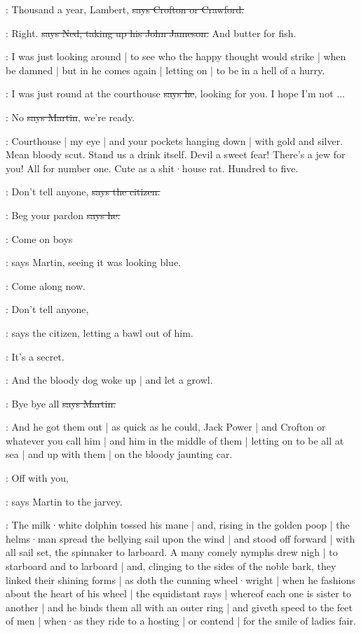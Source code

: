 \crofton:
Thousand a year,
Lambert,
\sout{says Crofton or Crawford.}

\lambert:
Right.
\sout{says Ned,
taking up his John Jameson.}
And butter for fish.

\Nq:
I was just looking around |
to see who the happy thought would strike |
when be damned |
but in he comes again |
letting on |
to be in a hell of a hurry.


\Bloom:
I was just round at the courthouse
\sout{says he},
looking for you.
I hope I'm not ...

\cunningham:
No
\sout{says Martin},
we're ready.

\Nq:
Courthouse |
my eye |
and your pockets hanging down |
with gold and silver.
Mean bloody scut.
Stand us a drink itself.
Devil a sweet fear!
There's a jew for you!
All for number one.
Cute as a shit·house rat.
Hundred to five.

\citizen:
Don't tell anyone,
\sout{says the citizen.}

\Bloom:
Beg your pardon
\sout{says he.}

\cunningham:
Come on boys

\Nq:
says Martin,
seeing it was looking blue.

\cunningham:
Come along now.

\citizen:
Don't tell anyone,

\Nq:
says the citizen,
letting a bawl out of him.

\citizen:
It's a secret.

\Nq:
And the bloody dog woke up |
and let a growl.

\cunningham:
Bye bye all
\sout{says Martin.}

\Nq:
And he got them out |
as quick as he could,
Jack Power |
and Crofton or whatever you call him |
and him in the middle of them |
letting on to be all at sea
 |
and up with them |
on the bloody jaunting car.

\cunningham:
Off with you,

\Nq:
says Martin to the jarvey.

:
The milk·white dolphin tossed his mane |
and,
rising in the golden poop |
the helms·man spread the bellying sail upon the wind |
and stood off forward |
with all sail set,
the spinnaker to larboard.
A many comely nymphs drew nigh |
to starboard and to larboard |
and,
clinging to the sides of the noble bark,
they linked their shining forms |
as doth the cunning wheel·wright |
when he fashions about the heart of his wheel |
the equidistant rays |
whereof each one is sister to another |
and he binds them all with an outer ring |
and giveth speed to the feet of men |
when·as they ride to a hosting |
or contend |
for the smile of ladies fair.

